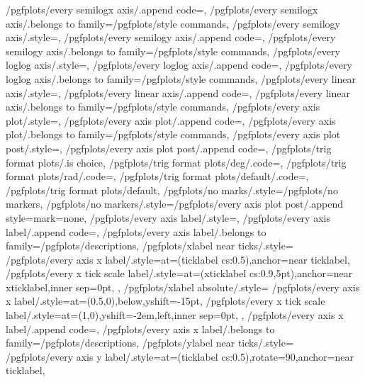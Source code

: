 {	/pgfplots/every semilogx axis/.append code={},
	/pgfplots/every semilogx axis/.belongs to family=/pgfplots/style commands,
	/pgfplots/every semilogy axis/.style={},
	/pgfplots/every semilogy axis/.append code={},
	/pgfplots/every semilogy axis/.belongs to family=/pgfplots/style commands,
	/pgfplots/every loglog axis/.style={},
	/pgfplots/every loglog axis/.append code={},
	/pgfplots/every loglog axis/.belongs to family=/pgfplots/style commands,
	/pgfplots/every linear axis/.style={},
	/pgfplots/every linear axis/.append code={},
	/pgfplots/every linear axis/.belongs to family=/pgfplots/style commands,
	/pgfplots/every axis plot/.style={},
	/pgfplots/every axis plot/.append code={},
	/pgfplots/every axis plot/.belongs to family=/pgfplots/style commands,
	/pgfplots/every axis plot post/.style={},
	/pgfplots/every axis plot post/.append code={},
	/pgfplots/trig format plots/.is choice,
	/pgfplots/trig format plots/deg/.code={\def\pgfplots@set@trig@format@plots{\pgfkeys{/pgf/trig format=deg}}},%
	/pgfplots/trig format plots/rad/.code={\def\pgfplots@set@trig@format@plots{\pgfkeys{/pgf/trig format=rad}}},%
	/pgfplots/trig format plots/default/.code={\let\pgfplots@set@trig@format@plots=\relax},%
	/pgfplots/trig format plots/default,
	/pgfplots/no marks/.style={/pgfplots/no markers},
	/pgfplots/no markers/.style={/pgfplots/every axis plot post/.append style={mark=none}},
	/pgfplots/every axis label/.style={},
	/pgfplots/every axis label/.append code={},
	/pgfplots/every axis label/.belongs to family=/pgfplots/descriptions,
	/pgfplots/xlabel near ticks/.style={%
		/pgfplots/every axis x label/.style={at={(ticklabel cs:0.5)},anchor=near ticklabel},%
		/pgfplots/every x tick scale label/.style={at={(xticklabel cs:0.9,5pt)},anchor=near xticklabel,inner sep=0pt},
	},%
	/pgfplots/xlabel absolute/.style={%
		/pgfplots/every axis x label/.style={at={(0.5,0)},below,yshift=-15pt},%
		/pgfplots/every x tick scale label/.style={at={(1,0)},yshift=-2em,left,inner sep=0pt},
	},%
	/pgfplots/every axis x label/.append code={},
	/pgfplots/every axis x label/.belongs to family=/pgfplots/descriptions,
	/pgfplots/ylabel near ticks/.style={%
		/pgfplots/every axis y label/.style={at={(ticklabel cs:0.5)},rotate=90,anchor=near ticklabel},%
}}
